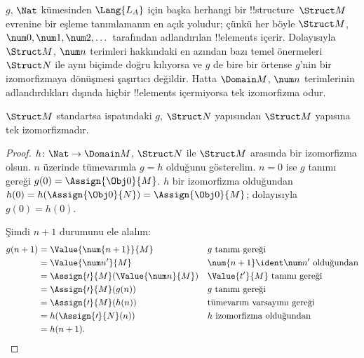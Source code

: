 \begin{explain}
$g$, $\Nat$ kümesinden $\Lang{L_A}$ için başka herhangi bir
!!{structure}~$\Struct M$ evrenine bir eşleme tanımlamanın en açık
yoludur; çünkü her böyle $\Struct M$, $\num0,\num1,\num2,\dots$
tarafından adlandırılan !!{element}s içerir. Dolayısıyla $\Struct M$,
$\num n$ terimleri hakkındaki en azından bazı temel önermeleri
$\Struct N$ ile aynı biçimde doğru kılıyorsa ve $g$ de bire bir örtense
$g$'nin bir izomorfizmaya dönüşmesi şaşırtıcı değildir. Hatta
$\Domain M$, $\num n$ terimlerinin adlandırdıkları dışında hiçbir
!!{element}s içermiyorsa tek izomorfizma odur.
\end{explain}

\begin{prop}
 $\Struct M$ standartsa
 ispatındaki $g$, $\Struct N$ yapısından
$\Struct M$ yapısına tek izomorfizmadır.
\end{prop}

\begin{proof}
$h\colon\Nat\to\Domain M$, $\Struct N$ ile $\Struct M$ arasında bir
izomorfizma olsun. $n$ üzerinde tümevarımla $g=h$ olduğunu gösterelim.
$n=0$ ise $g$ tanımı gereği $g(0)=\Assign{\Obj0}{M}$. $h$ bir
izomorfizma olduğundan
$h(0)=h(\Assign{\Obj0}{N})=\Assign{\Obj0}{M}$; dolayısıyla
$g(0)=h(0)$.

Şimdi $n+1$ durumunu ele alalım:
\begin{align*}
  g(n+1) & = \Value{\num{n+1}}{M} && \text{$g$ tanımı gereği}\\
  & = \Value{\num n'}{M} && \text{$\num{n+1}\ident\num n'$ olduğundan}\\
  & = \Assign{\prime}{M}(\Value{\num n}{M})
    && \text{$\Value{t'}{M}$ tanımı gereği}\\
  & = \Assign{\prime}{M}(g(n)) && \text{$g$ tanımı gereği}\\
  & = \Assign{\prime}{M}(h(n)) && \text{tümevarım varsayımı gereği}\\
  & = h(\Assign{\prime}{N}(n)) && \text{$h$ izomorfizma olduğundan}\\
  & = h(n+1).
\end{align*}
\end{proof}

